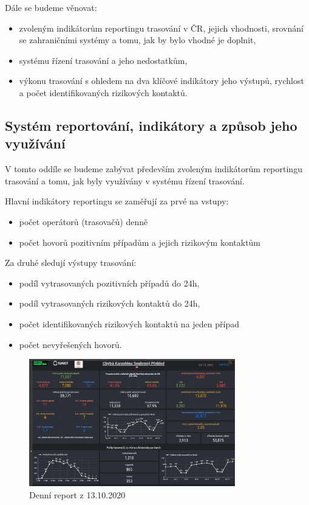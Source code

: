 Dále se budeme věnovat:
\begin{itemize}
\item zvoleným indikátorům reportingu trasování v ČR, jejich vhodnosti, srovnání se zahraničními systémy a tomu, jak by bylo vhodné je doplnit,
\item systému řízení trasování a jeho nedostatkům,
\item výkonu trasování s ohledem na dva klíčové indikátory jeho výstupů, rychlost a počet identifikovaných rizikových kontaktů.
\end{itemize}

\subsection*{Systém reportování, indikátory a způsob jeho využívání}

V tomto oddíle se budeme zabývat především zvoleným indikátorům reportingu trasování a tomu, jak byly využívány v systému řízení trasování.

Hlavní indikátory reportingu se zaměřují za prvé na vstupy:
\begin{itemize}
\item počet operátorů (trasovačů) denně
\item počet hovorů pozitivním případům a jejich rizikovým kontaktům
\end{itemize}

Za druhé sledují výstupy trasování:
\begin{itemize}
\item podíl vytrasovaných pozitivních případů do 24h,
\item podíl vytrasovaných rizikových kontaktů do 24h,
\item počet identifikovaných rizikových kontaktů na jeden případ
\item počet nevyřešených hovorů.
\end{itemize}

\begin{figure}[ht]
    \centering
    \includegraphics[width=0.8\textwidth]{./pic/daktela.jpg}
    \caption{Denní report z 13.10.2020}
    \label{fig:daktela}
\end{figure}




